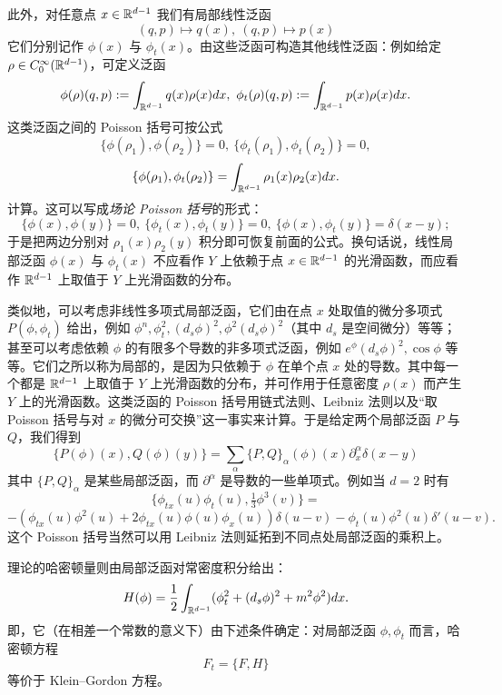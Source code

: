 此外，对任意点 $x\in \Bbb R^{d-1}$ 我们有局部线性泛函
$$
(q,p)\mapsto q(x),\ (q,p)\mapsto p(x)
$$
它们分别记作 $\phi(x)$ 与 $\phi_t(x)$。由这些泛函可构造其他线性泛函：例如给定 $\rho\in C^\infty_0(\Bbb R^{d-1})$，可定义泛函
$$
\phi(\rho)(q,p):=\int_{\Bbb R^{d-1}}q(x)\rho(x)dx,\ \phi_t(\rho)(q,p):=\int_{\Bbb R^{d-1}}p(x)\rho(x)dx.
$$
这类泛函之间的 Poisson 括号可按公式
$$
\lbrace \phi(\rho_1),\phi(\rho_2)\rbrace=0,\ 
\lbrace \phi_t(\rho_1),\phi_t(\rho_2)\rbrace=0,
$$
$$
\lbrace \phi(\rho_1),\phi_t(\rho_2)\rbrace=\int_{\Bbb R^{d-1}}\rho_1(x)\rho_2(x)dx.
$$
计算。这可以写成\emph{场论 Poisson 括号}的形式：
$$
\lbrace \phi(x),\phi(y)\rbrace=0,\ 
\lbrace \phi_t(x),\phi_t(y)\rbrace=0,\
\lbrace \phi(x),\phi_t(y)\rbrace=\delta(x-y);
$$
于是把两边分别对 $\rho_1(x)\rho_2(y)$ 积分即可恢复前面的公式。换句话说，线性局部泛函 $\phi(x)$ 与 $\phi_t(x)$ 不应看作 $Y$ 上依赖于点 $x\in \Bbb R^{d-1}$ 的光滑函数，而应看作 $\Bbb R^{d-1}$ 上取值于 $Y$ 上光滑函数的分布。

类似地，可以考虑非线性多项式局部泛函，它们由在点 $x$ 处取值的微分多项式 $P(\phi,\phi_t)$ 给出，例如 $\phi^n,\phi_t^2,(d_s\phi)^2, \phi^2 (d_s\phi)^2$（其中 $d_s$ 是空间微分）等等；甚至可以考虑依赖 $\phi$ 的有限多个导数的非多项式泛函，例如 $e^\phi (d_s\phi)^2, \cos \phi$ 等等。它们之所以称为局部的，是因为只依赖于 $\phi$ 在单个点 $x$ 处的导数。其中每一个都是 $\Bbb R^{d-1}$ 上取值于 $Y$ 上光滑函数的分布，并可作用于任意密度 $\rho(x)$ 而产生 $Y$ 上的光滑函数。这类泛函的 Poisson 括号用链式法则、Leibniz 法则以及“取 Poisson 括号与对 $x$ 的微分可交换”这一事实来计算。于是给定两个局部泛函 $P$ 与 $Q$，我们得到
$$
\lbrace P(\phi)(x),Q(\phi)(y)\rbrace=\sum_\alpha \lbrace P,Q\rbrace_\alpha(\phi)(x)\partial^\alpha_x\delta(x-y)
$$
其中 $\lbrace P,Q\rbrace_\alpha$ 是某些局部泛函，而 $\partial^\alpha$ 是导数的一些单项式。例如当 $d=2$ 时有
$$
\lbrace \phi_{tx}(u)\phi_t(u), \tfrac{1}{3}\phi^3(v)\rbrace=
$$
$$
-(\phi_{tx}(u)\phi^2(u)+2\phi_{tx}(u)\phi(u)\phi_x(u))\delta(u-v)-\phi_{t}(u)\phi^2(u)\delta'(u-v).
$$
这个 Poisson 括号当然可以用 Leibniz 法则延拓到不同点处局部泛函的乘积上。

理论的哈密顿量则由局部泛函对常密度积分给出：
$$
H(\phi)=\frac{1}{2}\int_{\Bbb R^{d-1}}(\phi_t^2+(d_s\phi)^2+m^2\phi^2)dx. 
$$
即，它（在相差一个常数的意义下）由下述条件确定：对局部泛函 $\phi,\phi_t$ 而言，哈密顿方程
$$
F_t=\lbrace F,H\rbrace
$$
等价于 Klein--Gordon 方程。

